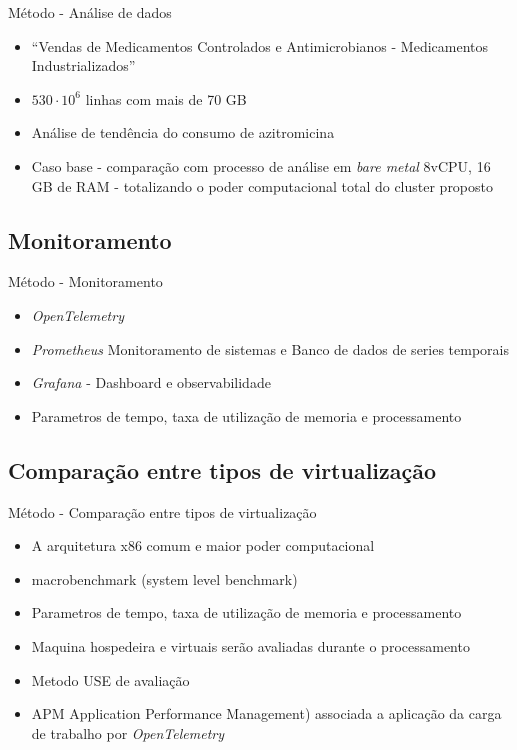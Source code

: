 \documentclass[10pt,brazil]{beamer}
\theoremstyle{definition}
\begin{document}
\begin{frame}{Método - Análise de dados}
  \begin{itemize}
    \item “Vendas de Medicamentos Controlados e Antimicrobianos - Medicamentos Industrializados”
    \item $530 \cdot 10^{6}$ linhas com mais de 70 GB
    \item Análise de tendência do consumo de azitromicina
    \item Caso base - comparação com processo de análise em \emph{bare metal} 8vCPU, 16 GB de RAM - totalizando o poder computacional total do cluster proposto
  \end{itemize}
\end{frame}

\subsection{Monitoramento}

\begin{frame}{Método - Monitoramento}
  \begin{itemize}
    \item \emph{OpenTelemetry}
    \item \emph{Prometheus} Monitoramento de sistemas e Banco de dados de series temporais
    \item \emph{Grafana} - Dashboard e observabilidade
    \item Parametros de tempo, taxa de utilização de memoria e processamento
  \end{itemize}
\end{frame}


\subsection{Comparação entre tipos de virtualização}

\begin{frame}{Método - Comparação entre tipos de virtualização}
  \begin{itemize}
    \item A arquitetura x86 comum e maior poder computacional %
    \item macrobenchmark (system level benchmark) %
    \item Parametros de tempo, taxa de utilização de memoria e processamento
    \item Maquina hospedeira e virtuais serão avaliadas durante o processamento
    \item Metodo USE de avaliação %
    \item APM Application Performance Management) associada a aplicação da carga de trabalho por \emph{OpenTelemetry} %
  \end{itemize}
\end{frame}
\end{document}
